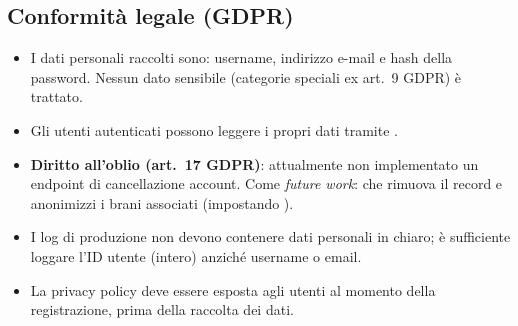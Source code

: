 \subsection{Conformità legale (GDPR)}
\begin{itemize}
    \item I dati personali raccolti sono: username, indirizzo e-mail e
    hash della password. Nessun dato sensibile (categorie speciali
    ex art.~9 GDPR) è trattato.
    \item Gli utenti autenticati possono leggere i propri dati tramite
    .
    \item \textbf{Diritto all'oblio (art.~17 GDPR)}: attualmente non
    implementato un endpoint di cancellazione account. Come
    \emph{future work}:  che rimuova il
    record  e anonimizzi i brani associati
    (impostando ).
    \item I log di produzione non devono contenere dati personali in
    chiaro; è sufficiente loggare l'ID utente (intero) anziché
    username o email.
    \item La privacy policy deve essere esposta agli utenti al momento
    della registrazione, prima della raccolta dei dati.
\end{itemize}
